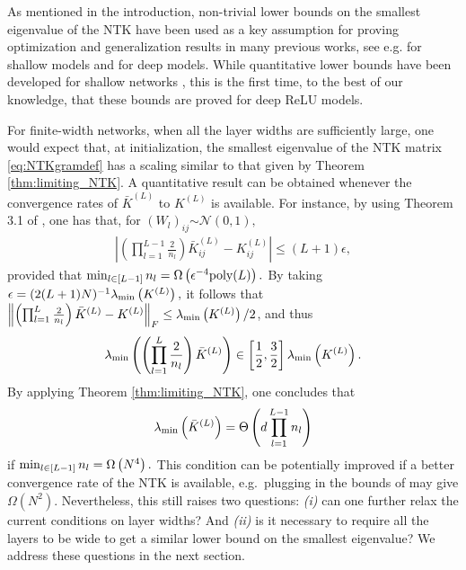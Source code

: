 \documentclass[11pt]{article}
\newcommand{\distas}[1]{\mathbin{\overset{#1}{\sim}}}
\newcommand{\bigOmg}[1]{\Omega\left(#1\right)}
\newcommand{\bigTheta}[1]{\Theta\left(#1\right)}
\newcommand{\norm}[1]{\left\|#1\right\|}
\newcommand{\abs}[1]{\left|#1\right|}
\newcommand{\evmin}[1]{\lambda_{\rm min}\left(#1\right)}
\def\min{\mathop{\rm min}\nolimits}
\begin{document}
As mentioned in the introduction, non-trivial lower bounds on the smallest eigenvalue of the NTK have been used 
as a key assumption for proving optimization and generalization results in many previous works,
see e.g. \citep{arora2019fine,ChenEtal2020, DuEtal2018_ICLR} for shallow models and \citep{DuEtal2019, HuangYau2020} for deep models.
While quantitative lower bounds have been developed for shallow networks \citep{GhorbaniEtal2020},
this is the first time, to the best of our knowledge, that these bounds are proved for deep ReLU models.

For finite-width networks, when all the layer widths are sufficiently large, one would expect that, at initialization,
the smallest eigenvalue of the NTK matrix \eqref{eq:NTKgramdef} has a scaling similar to that given by Theorem \ref{thm:limiting_NTK}. 
A quantitative result can be obtained whenever the convergence rates of $\bar{K}^{(L)}$ to $K^{(L)}$  is available.
For instance, by using Theorem 3.1 of \citep{AroraEtal2019}, one has that, for $(W_l)_{ij}\distas{}\mathcal{N}(0,1),$
        \vspace{-3pt}
\begin{align}
    \abs{\left(\prod_{l=1}^{L-1}\frac{2}{n_l}\right) \bar{K}^{(L)}_{ij} - K^{(L)}_{ij}}
    \leq (L+1)\epsilon,
\end{align}
provided that $\min_{l\in[L-1]} n_l=\bigOmg{\epsilon^{-4}{\textrm{poly}(L)}}.$
By taking $\epsilon=(2(L+1)N)^{-1}\evmin{K^{(L)}},$ 
it follows that $\norm{\left(\prod_{l=1}^{L}\frac{2}{n_l}\right) \bar{K}^{(L)}-K^{(L)}}_{F}\leq\evmin{K^{(L)}}/2$, and thus
        \vspace{-3pt}
\begin{align}
    \evmin{\left(\prod_{l=1}^{L}\frac{2}{n_l}\right)\bar{K}^{(L)}}\in\left[\frac{1}{2}, \frac{3}{2}\right] \evmin{K^{(L)}} .
\end{align}
By applying Theorem \ref{thm:limiting_NTK}, one concludes that
        \vspace{-3pt}
\begin{align}
    \evmin{\bar{K}^{(L)}}=\bigTheta{d\prod_{l=1}^{L-1} n_l}
\end{align}
if $\min_{l\in[L-1]}n_l=\bigOmg{N^4}.$
This condition can be potentially improved if a better convergence rate of the NTK is available, e.g.\ plugging in the bounds of \citep{Sam2021} may give $\Omega(N^2)$.
Nevertheless, this still raises two questions: \emph{(i)} can one further relax the current conditions on layer widths? 
And \emph{(ii)} is it necessary to require all the layers to be wide 
to get a similar lower bound on the smallest eigenvalue? We address these questions in the next section.
\end{document}
